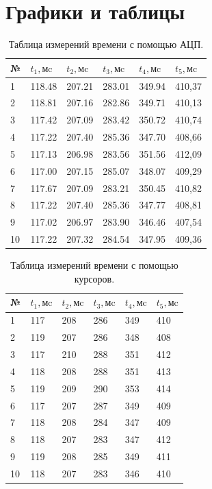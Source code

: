 \documentclass[12pt]{article}
\begin{document}
\section{Графики и таблицы}
\begin{table}[h!]
\centering
\begin{tabular}{ |p{0.6cm}|p{1.2cm}|p{1.2cm}|p{1.2cm}|p{1.2cm}|p{1.2cm}| }
\hline
№ & $t_1, \text{мc}$ & $t_2, \text{мc}$ & $t_3, \text{мc}$ & $t_4, \text{мc}$ & $t_5, \text{мc}$ \\
\hline
1&	118.48&	207.21&	283.01&	349.94&	410,37\\
\hline
2&	118.81&	207.16&	282.86&	349.71&	410,13\\
\hline
3&	117.42&	207.09&	283.42&	350.72&	410,74\\
\hline
4&	117.22& 207.40& 285.36& 347.70& 408,66\\
\hline
5&	117.13& 206.98& 283.56& 351.56& 412,09\\
\hline
6&	117.00& 207.15& 285.07& 348.07& 409,29\\
\hline
7&	117.67& 207.09& 283.21& 350.45& 410,82\\
\hline
8&	117.22& 207.40& 285.36& 347.77& 408,81\\
\hline
9&	117.02&	206.97&	283.90&	346.46&	407,54\\
\hline
10&	117.22&	207.32&	284.54&	347.95&	409,36\\
\hline
\end{tabular}
\caption{Таблица измерений времени с помощью АЦП.}
\end{table}
\begin{table}[h!]
\centering
\begin{tabular}{ |p{0.6cm}|p{1.2cm}|p{1.2cm}|p{1.2cm}|p{1.2cm}|p{1.2cm}| }
\hline
№ & $t_1, \text{мc}$ & $t_2, \text{мc}$ & $t_3, \text{мc}$ & $t_4, \text{мc}$ & $t_5, \text{мc}$ \\
\hline
1&	117& 208& 286& 349& 410\\
\hline
2&	119& 207& 286& 348& 408\\
\hline
3&	117& 210& 288& 351& 412\\
\hline
4&	118& 208& 288& 351& 413\\
\hline
5&	119& 209& 290& 353& 414\\
\hline
6&	117& 207& 287& 349& 409\\
\hline
7&	118& 208& 284& 347& 409\\
\hline
8&	118& 207& 283& 347& 412\\
\hline
9&	119& 208& 285& 349& 411\\
\hline
10&	118& 207& 283& 346& 410\\
\hline
\end{tabular}
\caption{Таблица измерений времени с помощью курсоров.}
\end{table}
\end{document}
